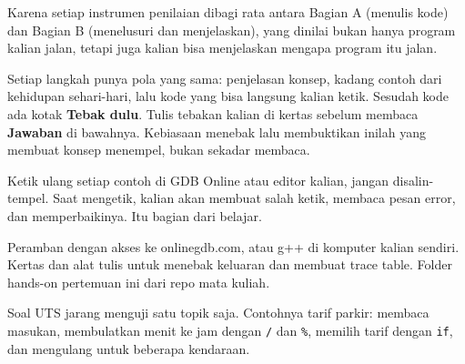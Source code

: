 \documentclass[a4paper]{article}
\begin{document}
\par\vspace{4pt}\par\vspace{6pt}
Karena setiap instrumen penilaian dibagi rata antara Bagian A (menulis kode) dan Bagian B (menelusuri dan menjelaskan), yang dinilai bukan hanya program kalian jalan, tetapi juga kalian bisa menjelaskan mengapa program itu jalan.

Setiap langkah punya pola yang sama: penjelasan konsep, kadang contoh dari kehidupan sehari-hari, lalu kode yang bisa langsung kalian ketik. Sesudah kode ada kotak \textbf{Tebak dulu}. Tulis tebakan kalian di kertas sebelum membaca \textbf{Jawaban} di bawahnya. Kebiasaan menebak lalu membuktikan inilah yang membuat konsep menempel, bukan sekadar membaca.

\begin{Penting}
Ketik ulang setiap contoh di GDB Online atau editor kalian, jangan disalin-tempel. Saat mengetik, kalian akan membuat salah ketik, membaca pesan error, dan memperbaikinya. Itu bagian dari belajar.
\end{Penting}
Peramban dengan akses ke onlinegdb.com, atau g++ di komputer kalian sendiri. Kertas dan alat tulis untuk menebak keluaran dan membuat trace table. Folder hands-on pertemuan ini dari repo mata kuliah.

Soal UTS jarang menguji satu topik saja. Contohnya tarif parkir: membaca masukan, membulatkan menit ke jam dengan \texttt{/} dan \texttt{\%}, memilih tarif dengan \texttt{if}, dan mengulang untuk beberapa kendaraan.
\end{document}
